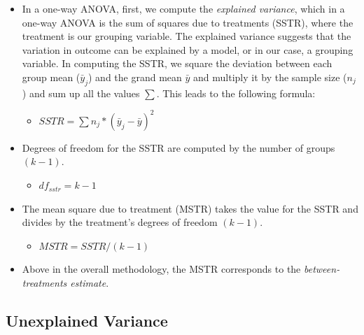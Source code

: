 \documentclass[
  letterpaper,
  DIV=11,
  numbers=noendperiod]{scrreprt}
\providecommand{\tightlist}{%
  \setlength{\itemsep}{0pt}\setlength{\parskip}{0pt}}\usepackage{longtable,booktabs,array}
\begin{document}
\begin{itemize}
\item
  In a one-way ANOVA, first, we compute the \emph{explained variance},
  which in a one-way ANOVA is the sum of squares due to treatments
  (SSTR), where the treatment is our grouping variable. The explained
  variance suggests that the variation in outcome can be explained by a
  model, or in our case, a grouping variable. In computing the SSTR, we
  square the deviation between each group mean (\(\bar{y}_j\)) and the
  grand mean \(\bar{y}\) and multiply it by the sample size (\(n_j\))
  and sum up all the values \(\sum\). This leads to the following
  formula:

  \begin{itemize}
  \tightlist
  \item
    \(SSTR = \sum{n_j*(\bar{y}_j-\bar{y}) ^2}\)
  \end{itemize}
\item
  Degrees of freedom for the SSTR are computed by the number of groups
  \((k-1)\).

  \begin{itemize}
  \tightlist
  \item
    \(df_{sstr} = k-1\)
  \end{itemize}
\item
  The mean square due to treatment (MSTR) takes the value for the SSTR
  and divides by the treatment's degrees of freedom \((k-1)\).

  \begin{itemize}
  \tightlist
  \item
    \(MSTR = SSTR/(k-1)\)
  \end{itemize}
\item
  Above in the overall methodology, the MSTR corresponds to the
  \emph{between-treatments estimate}.
\end{itemize}

\subsection{Unexplained Variance}\label{unexplained-variance}
\end{document}
